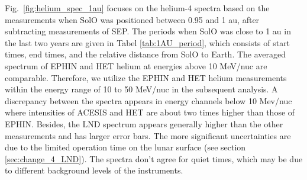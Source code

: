Fig.~\ref{fig:helium_spec_1au} focuses on the helium-4 spectra based on the measurements when \ac{SolO} was positioned between 0.95 and 1 au, after subtracting measurements of \acs{SEP}. The periods when \ac{SolO} was close to 1 au in the last two years are given in Tabel \ref{tab:1AU_period}, which consists of start times, end times, and the relative distance from \ac{SolO} to Earth.
The averaged spectrum of \ac{EPHIN} and \ac{HET} helium at energies above 10 MeV/nuc are comparable. Therefore, we utilize the \ac{EPHIN} and \ac{HET} helium measurements within the energy range of 10 to 50 MeV/nuc in the subsequent analysis.
A discrepancy between the spectra appears in energy channels below 10 Mev/nuc where intensities of \ac{ACESIS} and \ac{HET} are about two times higher than those of \ac{EPHIN}. Besides, the \ac{LND} spectrum appears generally higher than the other measurements and has larger error bars. The more significant uncertainties are due to the limited operation time on the lunar surface (see section \ref{sec:change_4_LND}). The spectra don't agree for quiet times, which may be due to different background levels of the instruments.





